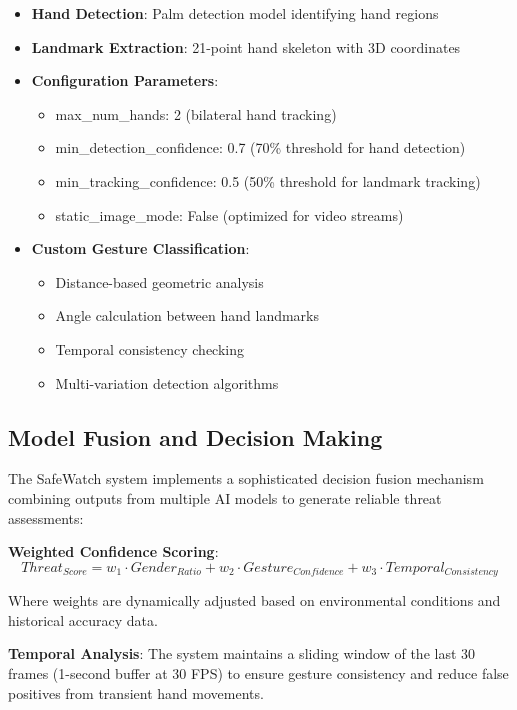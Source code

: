 \documentclass[12pt,a4paper]{article}
\begin{document}
\begin{itemize}
    \item \textbf{Hand Detection}: Palm detection model identifying hand regions
    \item \textbf{Landmark Extraction}: 21-point hand skeleton with 3D coordinates
    \item \textbf{Configuration Parameters}:
        \begin{itemize}
            \item max\_num\_hands: 2 (bilateral hand tracking)
            \item min\_detection\_confidence: 0.7 (70\% threshold for hand detection)
            \item min\_tracking\_confidence: 0.5 (50\% threshold for landmark tracking)
            \item static\_image\_mode: False (optimized for video streams)
        \end{itemize}
    \item \textbf{Custom Gesture Classification}:
        \begin{itemize}
            \item Distance-based geometric analysis
            \item Angle calculation between hand landmarks
            \item Temporal consistency checking
            \item Multi-variation detection algorithms
        \end{itemize}
\end{itemize}

\subsection{Model Fusion and Decision Making}

The SafeWatch system implements a sophisticated decision fusion mechanism combining outputs from multiple AI models to generate reliable threat assessments:

\textbf{Weighted Confidence Scoring}:
\begin{equation}
Threat_{Score} = w_1 \cdot Gender_{Ratio} + w_2 \cdot Gesture_{Confidence} + w_3 \cdot Temporal_{Consistency}
\end{equation}

Where weights are dynamically adjusted based on environmental conditions and historical accuracy data.

\textbf{Temporal Analysis}: The system maintains a sliding window of the last 30 frames (1-second buffer at 30 FPS) to ensure gesture consistency and reduce false positives from transient hand movements.
\end{document}
